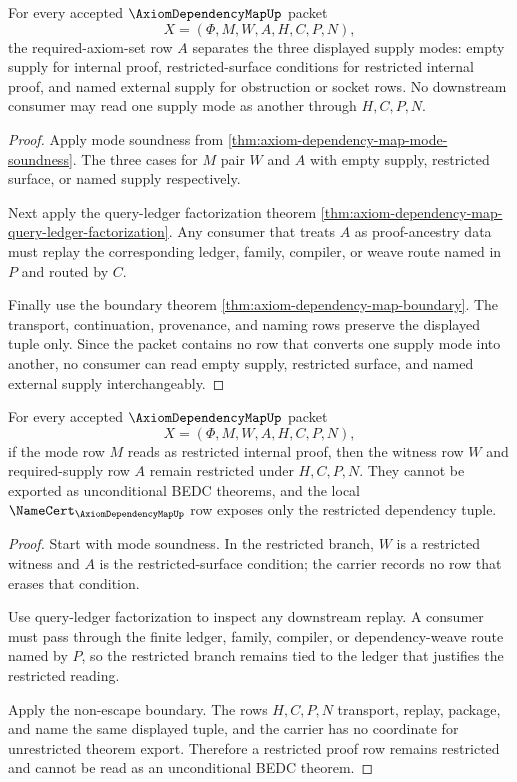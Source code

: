 \begin{theorem}
\label{thm:axiom-dependency-map-required-supply-separation}
For every accepted $\AxiomDependencyMapUp$ packet
$$
X=(\Phi,M,W,A,H,C,P,N),
$$
the required-axiom-set row $A$ separates the three displayed supply modes: empty supply for internal proof, restricted-surface conditions for restricted internal proof, and named external supply for obstruction or socket rows. No downstream consumer may read one supply mode as another through $H,C,P,N$.
\end{theorem}
\begin{proof}
Apply mode soundness from \autoref{thm:axiom-dependency-map-mode-soundness}. The three cases for $M$ pair $W$ and $A$ with empty supply, restricted surface, or named supply respectively.

Next apply the query-ledger factorization theorem \autoref{thm:axiom-dependency-map-query-ledger-factorization}. Any consumer that treats $A$ as proof-ancestry data must replay the corresponding ledger, family, compiler, or weave route named in $P$ and routed by $C$.

Finally use the boundary theorem \autoref{thm:axiom-dependency-map-boundary}. The transport, continuation, provenance, and naming rows preserve the displayed tuple only. Since the packet contains no row that converts one supply mode into another, no consumer can read empty supply, restricted surface, and named external supply interchangeably.
\end{proof}

\begin{theorem}
\label{thm:axiom-dependency-map-restricted-row-nonescape}
For every accepted $\AxiomDependencyMapUp$ packet
$$
X=(\Phi,M,W,A,H,C,P,N),
$$
if the mode row $M$ reads as restricted internal proof, then the witness row $W$ and required-supply row $A$ remain restricted under $H,C,P,N$. They cannot be exported as unconditional BEDC theorems, and the local $\NameCert_{\AxiomDependencyMapUp}$ row exposes only the restricted dependency tuple.
\end{theorem}
\begin{proof}
Start with mode soundness. In the restricted branch, $W$ is a restricted witness and $A$ is the restricted-surface condition; the carrier records no row that erases that condition.

Use query-ledger factorization to inspect any downstream replay. A consumer must pass through the finite ledger, family, compiler, or dependency-weave route named by $P$, so the restricted branch remains tied to the ledger that justifies the restricted reading.

Apply the non-escape boundary. The rows $H,C,P,N$ transport, replay, package, and name the same displayed tuple, and the carrier has no coordinate for unrestricted theorem export. Therefore a restricted proof row remains restricted and cannot be read as an unconditional BEDC theorem.
\end{proof}

